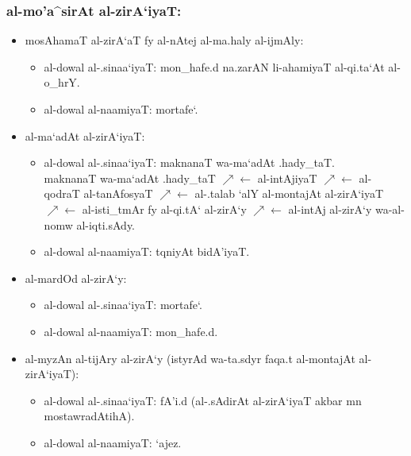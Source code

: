 \subsubsection{al-mo'a^sirAt al-zirA`iyaT:}

\begin{itemize}
    \item mosAhamaT al-zirA`aT fy al-nAtej al-ma.haly al-ijmAly:
    \begin{itemize}
        \item al-dowal al-.sinaa`iyaT: mon_hafe.d na.zarAN li-ahamiyaT al-qi.ta`At al-o_hrY.
        \item al-dowal al-naamiyaT: mortafe`.
    \end{itemize}
    
    \item al-ma`adAt al-zirA`iyaT:
    \begin{itemize}
        \item al-dowal al-.sinaa`iyaT: maknanaT wa-ma`adAt .hady_taT.\\
            maknanaT wa-ma`adAt .hady_taT
            $\nearrow\leftarrow$ al-intAjiyaT
            $\nearrow\leftarrow$ al-qodraT al-tanAfosyaT
            $\nearrow\leftarrow$ al-.talab `alY al-montajAt al-zirA`iyaT
            $\nearrow\leftarrow$ al-isti_tmAr fy al-qi.tA` al-zirA`y
            $\nearrow\leftarrow$ al-intAj al-zirA`y wa-al-nomw al-iqti.sAdy.
        \item al-dowal al-naamiyaT: tqniyAt bidA'iyaT.
    \end{itemize}
    
    \item al-mardOd al-zirA`y:
     \begin{itemize}
        \item al-dowal al-.sinaa`iyaT: mortafe`.
        \item al-dowal al-naamiyaT: mon_hafe.d.
    \end{itemize}
    
    \item al-myzAn al-tijAry al-zirA`y  (istyrAd wa-ta.sdyr faqa.t al-montajAt al-zirA`iyaT):
     \begin{itemize}
        \item al-dowal al-.sinaa`iyaT: fA'i.d (al-.sAdirAt al-zirA`iyaT akbar mn mostawradAtihA).
        \item al-dowal al-naamiyaT: `ajez.
    \end{itemize}
\end{itemize}

